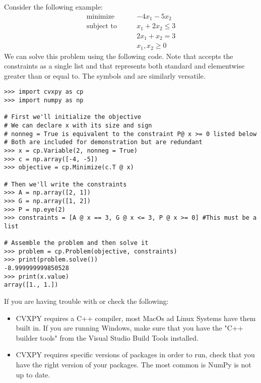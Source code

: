 Consider the following example:
\begin{align*}
\text{minimize}\qquad &-4x_1-5x_2 \\
\text{subject to}\qquad &x_1+2x_2 \leq 3 \\
	        &2x_1+x_2 = 3 \\
		&x_1, x_2 \geq 0
\end{align*}
We can solve this problem using the following code.
Note that  accepts the constraints as a single list and that \li{>=} represents both standard and elementwise greater than or equal to.
The symbols \li{<=} and \li{==} are similarly versatile.

\begin{lstlisting}
>>> import cvxpy as cp
>>> import numpy as np

# First we'll initialize the objective
# We can declare x with its size and sign
# nonneg = True is equivalent to the constraint P@ x >= 0 listed below
# Both are included for demonstration but are redundant
>>> x = cp.Variable(2, nonneg = True)	
>>> c = np.array([-4, -5])
>>> objective = cp.Minimize(c.T @ x)

# Then we'll write the constraints
>>> A = np.array([2, 1])
>>> G = np.array([1, 2])
>>> P = np.eye(2)
>>> constraints = [A @ x == 3, G @ x <= 3, P @ x >= 0] #This must be a list

# Assemble the problem and then solve it
>>> problem = cp.Problem(objective, constraints)
>>> print(problem.solve())
-8.999999999850528
>>> print(x.value)
array([1., 1.])
\end{lstlisting}

\begin{warn}
	If you are having trouble with  or  check the following:
	\begin{itemize}
		\item CVXPY requires a C++ compiler, most MacOs ad Linux Systems have them built in. 
		If you are running Windows, make sure that you have the "C++ builder tools" from the Visual Studio Build Tools installed.
		\item CVXPY requires specific versions of packages in order to run, check that you have the right version of your packages. 
		The most common is NumPy is not up to date.
	\end{itemize}
\end{warn}

